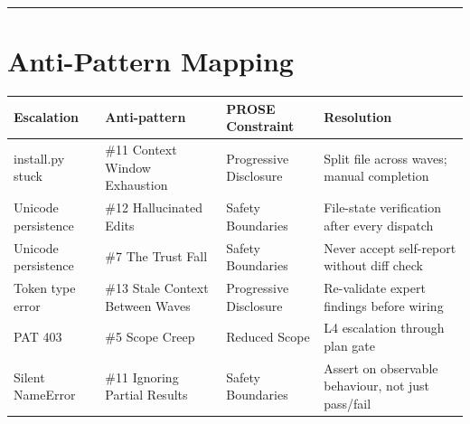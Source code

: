 \documentclass[
  a4paper,
  DIV=11,
  numbers=noendperiod]{scrreprt}
\newcounter{none} %
\begin{document}
\begin{center}\rule{0.5\linewidth}{0.5pt}\end{center}

\section{Anti-Pattern Mapping}\label{anti-pattern-mapping}

{\def\LTcaptype{none} %
\begin{longtable}[]{@{}
  >{\raggedright\arraybackslash}p{}
  >{\raggedright\arraybackslash}p{}
  >{\raggedright\arraybackslash}p{}
  >{\raggedright\arraybackslash}p{}@{}}
\toprule\noalign{}
\begin{minipage}[b]{\linewidth}\raggedright
Escalation
\end{minipage} & \begin{minipage}[b]{\linewidth}\raggedright
Anti-pattern
\end{minipage} & \begin{minipage}[b]{\linewidth}\raggedright
PROSE Constraint
\end{minipage} & \begin{minipage}[b]{\linewidth}\raggedright
Resolution
\end{minipage} \\
\midrule\noalign{}
\endhead
\bottomrule\noalign{}
\endlastfoot
install.py stuck & \#11 Context Window Exhaustion & Progressive
Disclosure & Split file across waves; manual completion \\
Unicode persistence & \#12 Hallucinated Edits & Safety Boundaries &
File-state verification after every dispatch \\
Unicode persistence & \#7 The Trust Fall & Safety Boundaries & Never
accept self-report without diff check \\
Token type error & \#13 Stale Context Between Waves & Progressive
Disclosure & Re-validate expert findings before wiring \\
PAT 403 & \#5 Scope Creep & Reduced Scope & L4 escalation through plan
gate \\
Silent NameError & \#11 Ignoring Partial Results & Safety Boundaries &
Assert on observable behaviour, not just pass/fail \\
\end{longtable}
}
\end{document}
